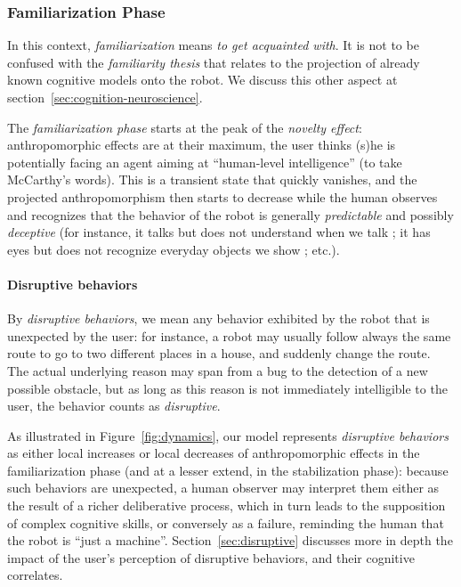 \documentclass{frontiersSCNS} %
\begin{document}
\subsubsection{Familiarization Phase\\}
\label{sec:familiarization}

In this context, \emph{familiarization} means \emph{to get acquainted with}.
It is not to be confused with the \emph{familiarity thesis} that relates to the
projection of already known cognitive models onto the robot. We discuss this other
aspect at section~\ref{sec:cognition-neuroscience}.

The \emph{familiarization phase} starts at the peak of the \emph{novelty
effect}: anthropomorphic effects are at their maximum, the user thinks (s)he is
potentially facing an agent aiming at ``human-level intelligence'' (to take
McCarthy's words). This is a transient state that quickly vanishes, and the
projected anthropomorphism then starts to decrease while the human observes and
recognizes that the behavior of the robot is generally \emph{predictable} and
possibly \emph{deceptive} (for instance, it talks but does not understand when
we talk ; it has eyes but does not recognize everyday objects we show ; etc.).

\paragraph{Disruptive behaviors\\}

By \emph{disruptive behaviors}, we mean any behavior exhibited by the robot that
is unexpected by the user: for instance, a robot may usually follow always the
same route to go to two different places in a house, and suddenly change the
route. The actual underlying reason may span from a bug to the detection of a
new possible obstacle, but as long as this reason is not immediately
intelligible to the user, the behavior counts as \emph{disruptive}.

As illustrated in Figure~\ref{fig:dynamics}, our model represents
\emph{disruptive behaviors} as either local increases or local decreases of
anthropomorphic effects in the familiarization phase (and at a lesser extend, in
the stabilization phase): because such behaviors are unexpected, a human
observer may interpret them either as the result of a richer deliberative
process, which in turn leads to the supposition of complex cognitive skills, or
conversely as a failure, reminding the human that the robot is ``just a
machine''. Section~\ref{sec:disruptive} discusses more in depth the impact of
the user's perception of disruptive behaviors, and their cognitive correlates.
\end{document}
